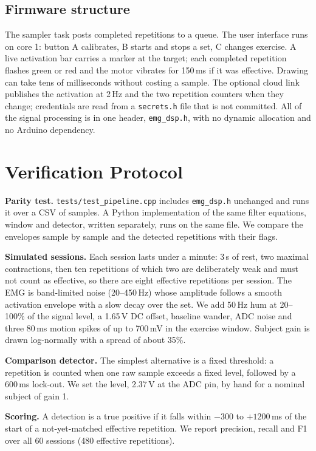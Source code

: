 \documentclass[11pt,letterpaper]{article}
\begin{document}
\subsection{Firmware structure}
The sampler task posts completed repetitions to a queue. The user interface runs on core 1: button A calibrates, B starts and stops a set, C changes exercise. A live activation bar carries a marker at the target; each completed repetition flashes green or red and the motor vibrates for 150\,ms if it was effective. Drawing can take tens of milliseconds without costing a sample. The optional cloud link publishes the activation at 2\,Hz and the two repetition counters when they change; credentials are read from a \texttt{secrets.h} file that is not committed. All of the signal processing is in one header, \texttt{emg\_dsp.h}, with no dynamic allocation and no Arduino dependency.

\section{Verification Protocol}\label{sec:protocol}
\textbf{Parity test.} \texttt{tests/test\_pipeline.cpp} includes \texttt{emg\_dsp.h} unchanged and runs it over a CSV of samples. A Python implementation of the same filter equations, window and detector, written separately, runs on the same file. We compare the envelopes sample by sample and the detected repetitions with their flags.

\textbf{Simulated sessions.} Each session lasts under a minute: 3\,s of rest, two maximal contractions, then ten repetitions of which two are deliberately weak and must not count as effective, so there are eight effective repetitions per session. The EMG is band-limited noise (20--450\,Hz) whose amplitude follows a smooth activation envelope with a slow decay over the set. We add 50\,Hz hum at 20--100\% of the signal level, a 1.65\,V DC offset, baseline wander, ADC noise and three 80\,ms motion spikes of up to 700\,mV in the exercise window. Subject gain is drawn log-normally with a spread of about 35\%.

\textbf{Comparison detector.} The simplest alternative is a fixed threshold: a repetition is counted when one raw sample exceeds a fixed level, followed by a 600\,ms lock-out. We set the level, 2.37\,V at the ADC pin, by hand for a nominal subject of gain 1.

\textbf{Scoring.} A detection is a true positive if it falls within $-300$ to $+1200$\,ms of the start of a not-yet-matched effective repetition. We report precision, recall and F1 over all 60 sessions (480 effective repetitions).
\end{document}
